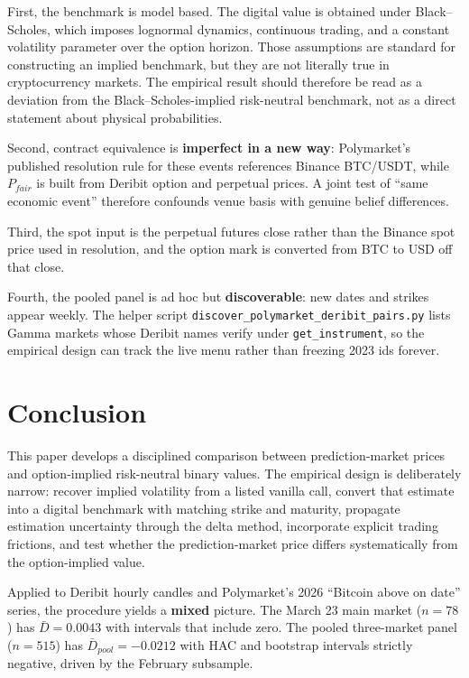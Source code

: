 \documentclass[11pt]{article}
\numberwithin{equation}{section}
\theoremstyle{plain}
\begin{document}
First, the benchmark is model based. The digital value is obtained under Black--Scholes, which imposes lognormal dynamics, continuous trading, and a constant volatility parameter over the option horizon. Those assumptions are standard for constructing an implied benchmark, but they are not literally true in cryptocurrency markets. The empirical result should therefore be read as a deviation from the Black--Scholes-implied risk-neutral benchmark, not as a direct statement about physical probabilities.

Second, contract equivalence is \textbf{imperfect in a new way}: Polymarket's published resolution rule for these events references Binance BTC/USDT, while $P_{fair}$ is built from Deribit option and perpetual prices. A joint test of ``same economic event'' therefore confounds venue basis with genuine belief differences.

Third, the spot input is the perpetual futures close rather than the Binance spot price used in resolution, and the option mark is converted from BTC to USD off that close.

Fourth, the pooled panel is ad hoc but \textbf{discoverable}: new dates and strikes appear weekly. The helper script \texttt{discover\_polymarket\_deribit\_pairs.py} lists Gamma markets whose Deribit names verify under \texttt{get\_instrument}, so the empirical design can track the live menu rather than freezing 2023 ids forever.

\section{Conclusion}
This paper develops a disciplined comparison between prediction-market prices and option-implied risk-neutral binary values. The empirical design is deliberately narrow: recover implied volatility from a listed vanilla call, convert that estimate into a digital benchmark with matching strike and maturity, propagate estimation uncertainty through the delta method, incorporate explicit trading frictions, and test whether the prediction-market price differs systematically from the option-implied value.

Applied to Deribit hourly candles and Polymarket's 2026 ``Bitcoin above on date'' series, the procedure yields a \textbf{mixed} picture. The March 23 main market ($n=78$) has $\bar{D}=0.0043$ with intervals that include zero. The pooled three-market panel ($n=515$) has $\bar{D}_{pool}=-0.0212$ with HAC and bootstrap intervals strictly negative, driven by the February subsample.
\end{document}
